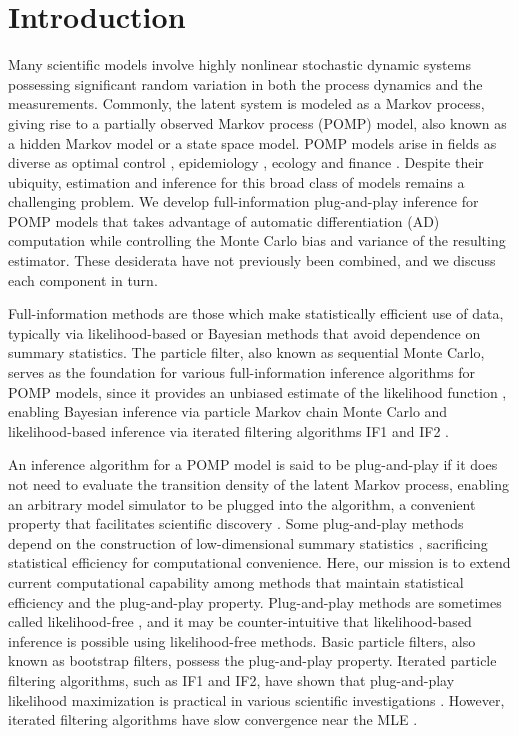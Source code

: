 \section{Introduction}

Many scientific models involve highly nonlinear stochastic dynamic systems possessing significant random variation in both the process dynamics and the measurements.
Commonly, the latent system is modeled as a Markov process, giving rise to a partially observed Markov process (POMP) model, also known as a hidden Markov model or a state space model.
POMP models arise in fields as diverse as optimal control \citep{singh22}, epidemiology \citep{he10, stocks17}, ecology \citep{knape12} and finance \citep{kim08, breto14}.
Despite their ubiquity, estimation and inference for this broad class of models remains a challenging problem.
We develop full-information plug-and-play inference for POMP models that takes advantage of automatic differentiation (AD) computation while controlling the Monte Carlo bias and variance of the resulting estimator.
These desiderata have not previously been combined, and we discuss each component in turn.

Full-information methods are those which make statistically efficient use of data, typically via likelihood-based or Bayesian methods that avoid dependence on summary statistics.
The particle filter, also known as sequential Monte Carlo, serves as the foundation for various full-information inference algorithms for POMP models, since it provides an unbiased estimate of the likelihood function \citep{delMoral04}, enabling Bayesian inference via particle Markov chain Monte Carlo \citep{andrieu10} and likelihood-based inference via iterated filtering algorithms IF1 \citep{ionides06-pnas} and IF2 \citep{ionides15}.

An inference algorithm for a POMP model is said to be plug-and-play if it does not need to evaluate the transition density of the latent Markov process, enabling an arbitrary model simulator to be plugged into the algorithm, a convenient property that facilitates scientific discovery \citep{he10}.
Some plug-and-play methods depend on the construction of low-dimensional summary statistics \citep{wood10,toni09}, sacrificing statistical efficiency for computational convenience.
Here, our mission is to extend current computational capability among methods that maintain statistical efficiency and the plug-and-play property.
Plug-and-play methods are sometimes called likelihood-free \citep{owen15}, and it may be counter-intuitive that likelihood-based inference is possible using likelihood-free methods. 
Basic particle filters, also known as bootstrap filters, possess the plug-and-play property.
Iterated particle filtering algorithms, such as IF1 and IF2, have shown that plug-and-play likelihood maximization is practical in various scientific investigations \citep{king08,blake14,pons-salort18,subramanian21,fox22,drake23}.
However, iterated filtering algorithms have slow convergence near the MLE \citep{doucet13}.

